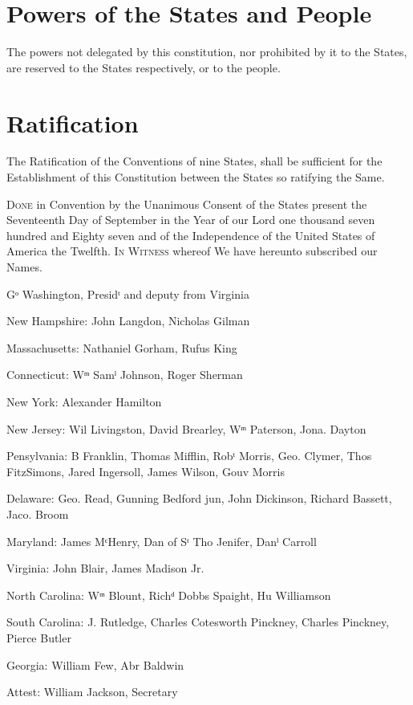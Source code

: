 \documentclass{constitution}
\begin{document}
\chapter{Powers of the States and People}
The powers not delegated by this constitution,
nor prohibited by it to the States,
are reserved to the States respectively,
or to the people.

\chapter{Ratification}
The Ratification of the Conventions of nine States,
shall be sufficient for the Establishment of this Constitution
between the States so ratifying the Same.

\textsc{Done} in Convention by the Unanimous Consent of the States present
the Seventeenth Day of September
in the Year of our Lord one thousand seven hundred and Eighty seven
and of the Independence of the United States of America the Twelfth.
\textsc{In Witness} whereof We have hereunto subscribed our Names.

Gᵒ Washington, Presidᵗ and deputy from Virginia

New Hampshire:		John Langdon, Nicholas Gilman

Massachusetts:		Nathaniel Gorham, Rufus King

Connecticut:		Wᵐ Samˡ Johnson, Roger Sherman

New York:		Alexander Hamilton

New Jersey:		Wil Livingston, David Brearley, Wᵐ Paterson, Jona. Dayton

Pensylvania:		B Franklin, Thomas Mifflin, Robᵗ Morris, Geo. Clymer, Thos FitzSimons,
			Jared Ingersoll, James Wilson, Gouv Morris

Delaware:		Geo. Read, Gunning Bedford jun, John Dickinson, Richard Bassett, Jaco. Broom

Maryland:		James MᶜHenry, Dan of Sᵗ Tho Jenifer, Danˡ Carroll

Virginia:		John Blair, James Madison Jr.

North Carolina:	Wᵐ Blount, Richᵈ Dobbs Spaight, Hu Williamson

South Carolina:	J. Rutledge, Charles Cotesworth Pinckney, Charles Pinckney, Pierce Butler

Georgia:		William Few, Abr Baldwin

Attest: William Jackson, Secretary
\end{document}
